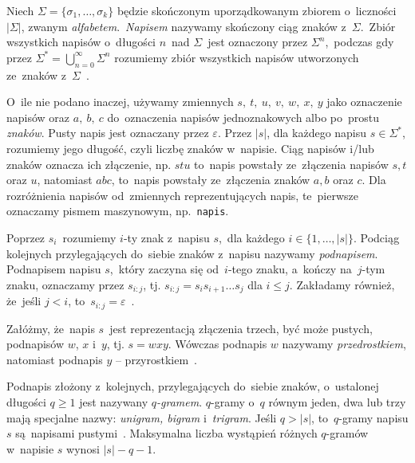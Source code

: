 \documentclass{praca1}
\begin{document}
\begin{definition}
Niech  $\Sigma = \{\sigma_1, \ldots, \sigma_k\}$ będzie skończonym uporządkowanym zbiorem o~liczności $|\Sigma|$, zwanym \emph{alfabetem}.~\emph{Napisem} nazywamy skończony ciąg znaków z~$\Sigma$.~Zbiór wszystkich napisów o~długości $n$~nad $\Sigma$~jest oznaczony przez $\Sigma^n$,~podczas gdy przez $\Sigma^* = \bigcup_{n=0}^{\infty}\Sigma^n$ rozumiemy zbiór wszystkich napisów utworzonych ze~znaków z~$\Sigma$~\cite{Boytsov2011:indexingmethods}.
\end{definition}

O~ile nie podano inaczej, używamy zmiennych $s,\ t,\ u,\ v,\ w,\ x,\ y$ jako oznaczenie napisów oraz $a,\ b,\ c$ do~oznaczenia napisów jednoznakowych albo po~prostu \emph{znaków}. Pusty napis jest oznaczany przez $\varepsilon$. Przez $|s|$, dla każdego napisu $s \in \Sigma^*$, rozumiemy jego długość, czyli liczbę znaków w~napisie. Ciąg napisów i/lub znaków oznacza ich złączenie, np. $stu$ to~napis powstały ze~złączenia napisów $s, t$ oraz $u$, natomiast $abc$, to~napis powstały ze~złączenia znaków $a, b$ oraz $c$. Dla rozróżnienia napisów od~zmiennych reprezentujących napis, te~pierwsze oznaczamy pismem maszynowym, np.~\verb|napis|.

Poprzez $s_i$~rozumiemy $i$-ty znak z~napisu $s$,~dla każdego $i \in \{1,\ldots,|s|\}$. Podciąg kolejnych przylegających do~siebie znaków z~napisu nazywamy \emph{podnapisem}. Podnapisem napisu $s$,~który zaczyna się od~$i$-tego znaku, a~kończy na~$j$-tym znaku, oznaczamy przez $s_{i:j}$, tj. $s_{i:j} = s_is_{i+1}\ldots s_j$ dla $i \leq j$. Zakładamy również, że~jeśli $j < i$, to~$s_{i:j} = \varepsilon$~\cite{Boytsov2011:indexingmethods,Loo2014:stringdist}.

\begin{definition}
Załóżmy, że~napis $s$~jest reprezentacją złączenia trzech, być może pustych, podnapisów $w$, $x$ i~$y$, tj. $s = wxy$. Wówczas podnapis $w$ nazywamy \emph{przedrostkiem}, natomiast podnapis $y$ -- przyrostkiem~\cite{Boytsov2011:indexingmethods}.
\end{definition}

\begin{definition}
Podnapis złożony z~kolejnych, przylegających do~siebie znaków, o~ustalonej długości $q\geq 1$ jest nazywany \emph{$q$-gramem}. $q$-gramy o~$q$ równym jeden, dwa lub trzy mają specjalne nazwy: \emph{unigram, bigram} i~\emph{trigram}. Jeśli $q > |s|$, to~$q$-gramy napisu $s$ są~napisami pustymi~\cite{Boytsov2011:indexingmethods}. Maksymalna liczba wystąpień różnych $q$-gramów w~napisie $s$ wynosi $|s|-q-1$.
\end{definition}
\end{document}
